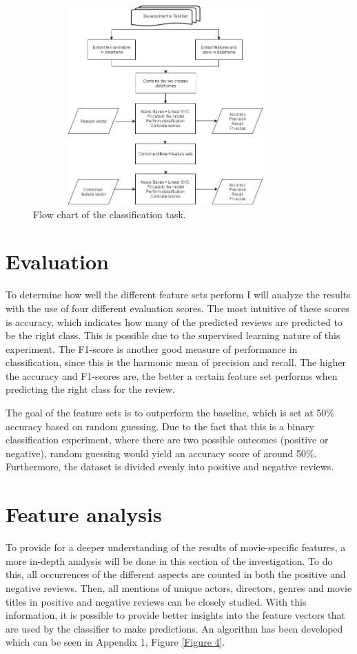 \documentclass[
10pt, %
a4paper, %
oneside, %
headinclude,footinclude, %
] {book}%
\begin{document}
\begin{figure}[hbtp]\centering
\includegraphics[width=4in, height=3in]{classification} 
\caption{Flow chart of the classification task.\label{Figure 2}}
\end{figure}

\section{Evaluation}

To determine how well the different feature sets perform I will analyze the results with the use of four different evaluation scores. The most intuitive of these scores is accuracy, which indicates how many of the predicted reviews are predicted to be the right class. This is possible due to the supervised learning nature of this experiment. The F1-score is another good measure of performance in classification, since this is the harmonic mean of precision and recall. The higher the accuracy and F1-scores are, the better a certain feature set performs when predicting the right class for the review.

The goal of the feature sets is to outperform the baseline, which is set at 50\% accuracy based on random guessing. Due to the fact that this is a binary classification experiment, where there are two possible outcomes (positive or negative), random guessing would yield an accuracy score of around 50\%. Furthermore, the dataset is divided evenly into positive and negative reviews.

\section{Feature analysis}

To provide for a deeper understanding of the results of movie-specific features, a more in-depth analysis will be done in this section of the investigation. To do this, all occurrences of the different aspects are counted in both the positive and negative reviews. Then, all mentions of unique actors, directors, genres and movie titles in positive and negative reviews can be closely studied. With this information, it is possible to provide better insights into the feature vectors that are used by the classifier to make predictions. An algorithm has been developed which can be seen in Appendix 1, Figure \ref{Figure 4}.
\end{document}
